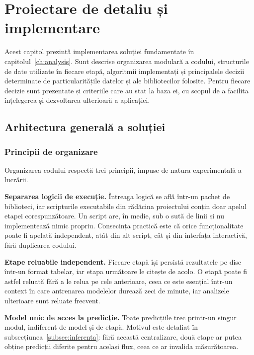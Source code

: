 \chapter{Proiectare de detaliu și implementare}\label{ch:proiectare}
\pagestyle{fancy}

Acest capitol prezintă implementarea soluției fundamentate în capitolul~\ref{ch:analysis}. Sunt descrise organizarea modulară a codului, structurile de date utilizate în fiecare etapă, algoritmii implementați și principalele decizii determinate de particularitățile datelor și ale bibliotecilor folosite. Pentru fiecare decizie sunt prezentate și criteriile care au stat la baza ei, cu scopul de a facilita înțelegerea și dezvoltarea ulterioară a aplicației.

\section{Arhitectura generală a soluției}\label{sec:arhitectura}

\subsection{Principii de organizare}\label{subsec:principii}

Organizarea codului respectă trei principii, impuse de natura experimentală a lucrării.

\textbf{Separarea logicii de execuție.} Întreaga logică se află într-un pachet de biblioteci, iar scripturile executabile din rădăcina proiectului conțin doar apelul etapei corespunzătoare. Un script are, în medie, sub o sută de linii și nu implementează nimic propriu. Consecința practică este că orice funcționalitate poate fi apelată independent, atât din alt script, cât și din interfața interactivă, fără duplicarea codului.

\textbf{Etape reluabile independent.} Fiecare etapă își persistă rezultatele pe disc într-un format tabelar, iar etapa următoare le citește de acolo. O etapă poate fi astfel reluată fără a le relua pe cele anterioare, ceea ce este esențial într-un context în care antrenarea modelelor durează zeci de minute, iar analizele ulterioare sunt reluate frecvent.

\textbf{Model unic de acces la predicție.} Toate predicțiile trec printr-un singur modul, indiferent de model și de etapă. Motivul este detaliat în subsecțiunea~\ref{subsec:inferenta}: fără această centralizare, două etape ar putea obține predicții diferite pentru același flux, ceea ce ar invalida măsurătoarea.


